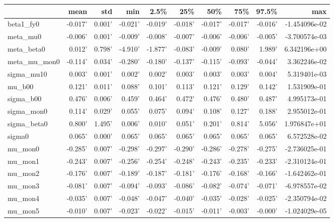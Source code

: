 \documentclass[a4paper]{article}
\begin{document}
\begin{table}
\begin{tabular}{lrrrrrrrrr}
\toprule
{} &    mean &    std &     min &    2.5\% &     25\% &     50\% &     75\% &   97.5\% &           max \\
\midrule
beta1\_fy0    & -0.017' & 0.001' & -0.021' & -0.019' & -0.018' & -0.017' & -0.017' & -0.016' & -1.454096e-02 \\
meta\_mu0     & -0.006' & 0.001' & -0.009' & -0.008' & -0.007' & -0.006' & -0.006' & -0.005' & -3.700574e-03 \\
meta\_beta0   &  0.012' & 0.798' & -4.910' & -1.877' & -0.083' & -0.009' &  0.080' &  1.989' &  6.342196e+00 \\
meta\_mu\_mon0 & -0.114' & 0.034' & -0.280' & -0.180' & -0.137' & -0.115' & -0.093' & -0.044' &  3.362246e-02 \\
sigma\_mu10   &  0.003' & 0.001' &  0.002' &  0.002' &  0.003' &  0.003' &  0.003' &  0.004' &  5.319401e-03 \\
mu\_b00       &  0.121' & 0.011' &  0.088' &  0.101' &  0.113' &  0.121' &  0.129' &  0.142' &  1.531909e-01 \\
sigma\_b00    &  0.476' & 0.006' &  0.459' &  0.464' &  0.472' &  0.476' &  0.480' &  0.487' &  4.995173e-01 \\
sigma\_mon0   &  0.114' & 0.029' &  0.055' &  0.075' &  0.094' &  0.108' &  0.127' &  0.188' &  2.955012e-01 \\
sigma\_beta0  &  0.800' & 1.495' &  0.006' &  0.010' &  0.051' &  0.201' &  0.814' &  5.056' &  1.976847e+01 \\
sigma0       &  0.065' & 0.000' &  0.065' &  0.065' &  0.065' &  0.065' &  0.065' &  0.065' &  6.572528e-02 \\
mu\_mon0      & -0.285' & 0.007' & -0.298' & -0.297' & -0.290' & -0.286' & -0.278' & -0.275' & -2.736025e-01 \\
mu\_mon1      & -0.243' & 0.007' & -0.256' & -0.254' & -0.248' & -0.243' & -0.235' & -0.233' & -2.310124e-01 \\
mu\_mon2      & -0.176' & 0.007' & -0.189' & -0.187' & -0.181' & -0.176' & -0.168' & -0.166' & -1.642462e-01 \\
mu\_mon3      & -0.081' & 0.007' & -0.094' & -0.093' & -0.086' & -0.082' & -0.074' & -0.071' & -6.978557e-02 \\
mu\_mon4      & -0.035' & 0.007' & -0.048' & -0.047' & -0.040' & -0.035' & -0.028' & -0.025' & -2.350794e-02 \\
mu\_mon5      & -0.010' & 0.007' & -0.023' & -0.022' & -0.015' & -0.011' & -0.003' & -0.000' & -1.024029e-05 \\

\end{tabular}
\end{table}
\end{document}
